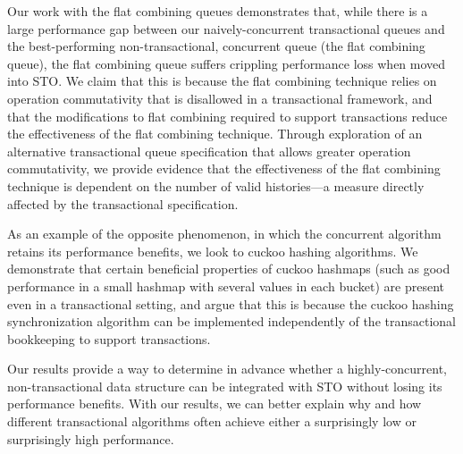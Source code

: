 Our work with the flat combining queues demonstrates that, while there is a large performance gap between our naively-concurrent transactional queues and the best-performing non-transactional, concurrent queue (the flat combining queue), the flat combining queue suffers crippling performance loss when moved into STO. We claim that this is because the flat combining technique relies on operation commutativity that is disallowed in a transactional framework, and that the modifications to flat combining required to support transactions reduce the effectiveness of the flat combining technique. Through exploration of an alternative transactional queue specification that allows greater operation commutativity, we provide evidence that the effectiveness of the flat combining technique is dependent on the number of valid histories---a measure directly affected by the transactional specification.

As an example of the opposite phenomenon, in which the concurrent algorithm retains its performance benefits, we look to cuckoo hashing algorithms. We demonstrate that certain beneficial properties of cuckoo hashmaps (such as good performance in a small hashmap with several values in each bucket) are present even in a transactional setting, and argue that this is because the cuckoo hashing synchronization algorithm can be implemented independently of the transactional bookkeeping to support transactions.

Our results provide a way to determine in advance whether a highly-concurrent, non-transactional data structure can be integrated with STO without losing its performance benefits. With our results, we can better explain why and how different transactional algorithms often achieve either a surprisingly low or surprisingly high performance.
